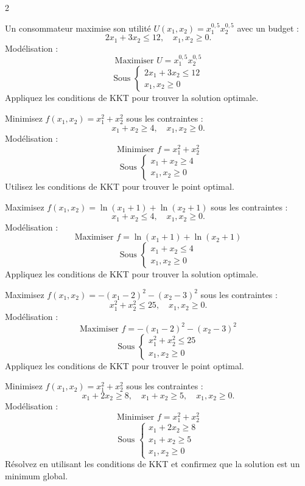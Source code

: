 \begin{multicols}{2}
\begin{exercice}
	Un consommateur maximise son utilité \( U(x_1, x_2) = x_1^{0,5} x_2^{0,5} \) avec un budget :
	\[
	2x_1 + 3x_2 \leq 12, \quad x_1, x_2 \geq 0.
	\]
	Modélisation :
	\[
	\text{Maximiser } U = x_1^{0,5} x_2^{0,5}
	\]
	\[
	\text{Sous } \begin{cases}
	2x_1 + 3x_2 \leq 12 \\
	x_1, x_2 \geq 0
	\end{cases}
	\]
	Appliquez les conditions de KKT pour trouver la solution optimale.
\end{exercice}

\begin{exercice}
	Minimisez \( f(x_1, x_2) = x_1^2 + x_2^2 \) sous les contraintes :
	\[
	x_1 + x_2 \geq 4, \quad x_1, x_2 \geq 0.
	\]
	Modélisation :
	\[
	\text{Minimiser } f = x_1^2 + x_2^2
	\]
	\[
	\text{Sous } \begin{cases}
	x_1 + x_2 \geq 4 \\
	x_1, x_2 \geq 0
	\end{cases}
	\]
	Utilisez les conditions de KKT pour trouver le point optimal.
\end{exercice}

\begin{exercice}
	Maximisez \( f(x_1, x_2) = \ln(x_1 + 1) + \ln(x_2 + 1) \) sous les contraintes :
	\[
	x_1 + x_2 \leq 4, \quad x_1, x_2 \geq 0.
	\]
	Modélisation :
	\[
	\text{Maximiser } f = \ln(x_1 + 1) + \ln(x_2 + 1)
	\]
	\[
	\text{Sous } \begin{cases}
	x_1 + x_2 \leq 4 \\
	x_1, x_2 \geq 0
	\end{cases}
	\]
	Appliquez les conditions de KKT pour trouver la solution optimale.
\end{exercice}

\begin{exercice}
	Maximisez \( f(x_1, x_2) = -(x_1 - 2)^2 - (x_2 - 3)^2 \) sous les contraintes :
	\[
	x_1^2 + x_2^2 \leq 25, \quad x_1, x_2 \geq 0.
	\]
	Modélisation :
	\[
	\text{Maximiser } f = -(x_1 - 2)^2 - (x_2 - 3)^2
	\]
	\[
	\text{Sous } \begin{cases}
	x_1^2 + x_2^2 \leq 25 \\
	x_1, x_2 \geq 0
	\end{cases}
	\]
	Appliquez les conditions de KKT pour trouver le point optimal.
\end{exercice}

\begin{exercice}
	Minimisez \( f(x_1, x_2) = x_1^2 + x_2^2 \) sous les contraintes :
	\[
	x_1 + 2x_2 \geq 8, \quad x_1 + x_2 \geq 5, \quad x_1, x_2 \geq 0.
	\]
	Modélisation :
	\[
	\text{Minimiser } f = x_1^2 + x_2^2
	\]
	\[
	\text{Sous } \begin{cases}
	x_1 + 2x_2 \geq 8 \\
	x_1 + x_2 \geq 5 \\
	x_1, x_2 \geq 0
	\end{cases}
	\]
	Résolvez en utilisant les conditions de KKT et confirmez que la solution est un minimum global.
\end{exercice}


\end{multicols}
